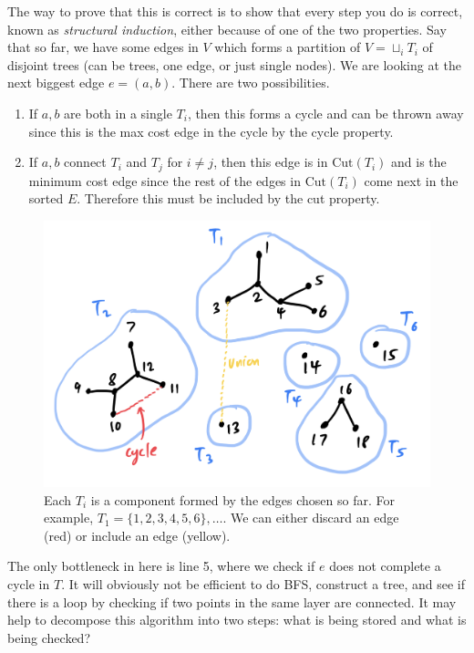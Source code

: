 \documentclass{article}
\begin{document}
      The way to prove that this is correct is to show that every step you do is correct, known as \textit{structural induction}, either because of one of the two properties. Say that so far, we have some edges in $V$ which forms a partition of $V = \sqcup_i T_i$ of disjoint trees (can be trees, one edge, or just single nodes). We are looking at the next biggest edge $e = (a, b)$. There are two possibilities. 
      \begin{enumerate}
        \item If $a, b$ are both in a single $T_i$, then this forms a cycle and can be thrown away since this is the max cost edge in the cycle by the cycle property. 
        \item If $a, b$ connect $T_i$ and $T_j$ for $i \neq j$, then this edge is in $\mathrm{Cut}(T_i)$ and is the minimum cost edge since the rest of the edges in $\mathrm{Cut}(T_i)$ come next in the sorted $E$. Therefore this must be included by the cut property. 
      \end{enumerate}

      \begin{figure}[H]
        \centering 
        \includegraphics[scale=0.4]{img/sets.png}
        \caption{Each $T_i$ is a component formed by the edges chosen so far. For example, $T_1 = \{1, 2, 3, 4, 5, 6\}, \ldots$. We can either discard an edge (red) or include an edge (yellow). } 
        \label{fig:sets}
      \end{figure}

      The only bottleneck in here is line 5, where we check if $e$ does not complete a cycle in $T$. It will obviously not be efficient to do BFS, construct a tree, and see if there is a loop by checking if two points in the same layer are connected. It may help to decompose this algorithm into two steps: what is being stored and what is being checked? 
\end{document}

